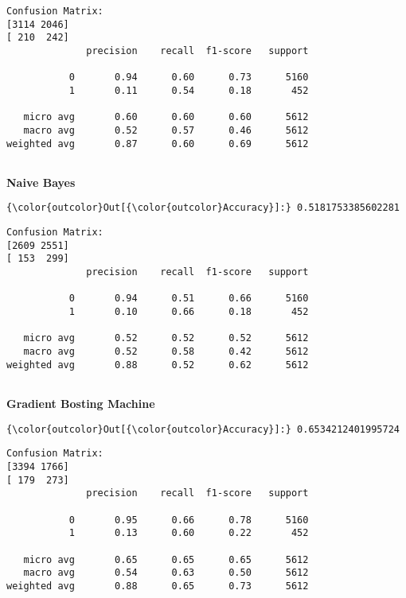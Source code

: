 \documentclass[11pt]{article}
\begin{document}
    \begin{Verbatim}[commandchars=\\\{\}]
Confusion Matrix: 
[3114 2046]
[ 210  242]
              precision    recall  f1-score   support

           0       0.94      0.60      0.73      5160
           1       0.11      0.54      0.18       452

   micro avg       0.60      0.60      0.60      5612
   macro avg       0.52      0.57      0.46      5612
weighted avg       0.87      0.60      0.69      5612


    \end{Verbatim}

\textbf{Naive Bayes}

\begin{Verbatim}[commandchars=\\\{\}]
{\color{outcolor}Out[{\color{outcolor}Accuracy}]:} 0.5181753385602281
\end{Verbatim}
   

    \begin{Verbatim}[commandchars=\\\{\}]
 Confusion Matrix: 
[2609 2551]
[ 153  299]
              precision    recall  f1-score   support

           0       0.94      0.51      0.66      5160
           1       0.10      0.66      0.18       452

   micro avg       0.52      0.52      0.52      5612
   macro avg       0.52      0.58      0.42      5612
weighted avg       0.88      0.52      0.62      5612


    \end{Verbatim}



\textbf{Gradient Bosting Machine}

\begin{Verbatim}[commandchars=\\\{\}]
{\color{outcolor}Out[{\color{outcolor}Accuracy}]:} 0.6534212401995724
\end{Verbatim}
            
\medskip

    \begin{Verbatim}[commandchars=\\\{\}]
Confusion Matrix: 
[3394 1766]
[ 179  273]
              precision    recall  f1-score   support

           0       0.95      0.66      0.78      5160
           1       0.13      0.60      0.22       452

   micro avg       0.65      0.65      0.65      5612
   macro avg       0.54      0.63      0.50      5612
weighted avg       0.88      0.65      0.73      5612


    \end{Verbatim}
\end{document}
